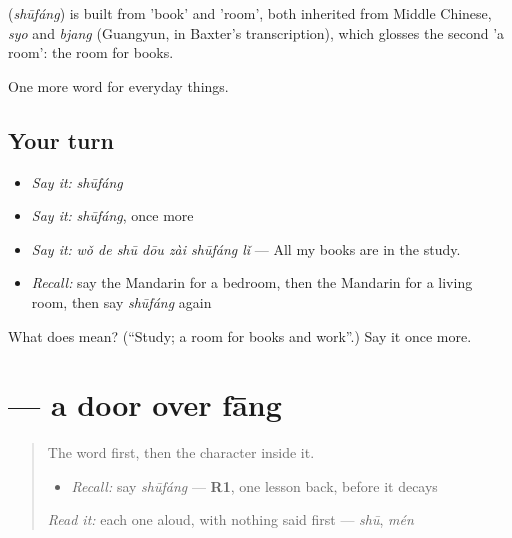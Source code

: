 \begin{cousinweb}
\textbf{} (\emph{shūfáng}) is built from  'book' and  'room', both inherited from Middle Chinese, \emph{syo} and \emph{bjang} (Guangyun, in Baxter's transcription), which glosses the second 'a room': the room for books.
\end{cousinweb}

\begin{grammarlens}[title={What you've built}]
One more word for everyday things.
\end{grammarlens}

\subsection*{Your turn}
\begin{itemize}
\raggedright
  \item \emph{Say it:} \emph{shūfáng}
  \item \emph{Say it:} \emph{shūfáng}, once more
  \item \emph{Say it:} \emph{wǒ de shū dōu zài shūfáng lǐ} — All my books are in the study.
  \item \emph{Recall:} say the Mandarin for a bedroom, then the Mandarin for a living room, then say \emph{shūfáng} again
\end{itemize}

\begin{tcolorbox}[breakable,colback=teal!4,colframe=teal!35!black,title={Before you move on}]
What does  mean? (\textquotedblleft{}Study; a room for books and work\textquotedblright{}.) Say it once more.
\end{tcolorbox}
\section[\texorpdfstring{\zh{房} (fáng)}{房 (fáng)}]{ — a door over fāng}

\label{lesson:ZH-W159-fang-room}



\begin{quote}
The word first, then the character inside it.

\begin{itemize}
\raggedright
  \item \emph{Recall:} say \emph{shūfáng} — \textbf{R1}, one lesson back, before it decays
\end{itemize}

\begin{quote}
 
\end{quote}

\emph{Read it:} each one aloud, with nothing said first — \emph{shū}, \emph{mén}
\end{quote}

